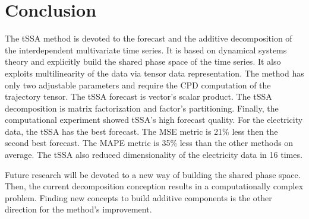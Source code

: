 \documentclass[referee, pdflatex, sn-mathphys-num]{sn-jnl}
\theoremstyle{definition}
\theoremstyle{plain}
\begin{document}
	\section{Conclusion}
	
		The tSSA method is devoted to the forecast and the additive decomposition of the interdependent multivariate time series. It is based on dynamical systems theory and explicitly build the shared phase space of the time series. It also exploits multilinearity of the data via tensor data representation. The method has only two adjustable parameters and require the CPD computation of the trajectory tensor. The tSSA forecast is vector's scalar product. The tSSA decomposition is matrix factorization and factor's partitioning. Finally, the computational experiment showed tSSA's high forecast quality. For the electricity data, the tSSA has the best forecast. The MSE metric is 21\% less then the second best forecast. The MAPE metric is 35\% less than the other methods on average. The tSSA also reduced dimensionality of the electricity data in 16 times.
		
		Future research will be devoted to a new way of building the shared phase space. Then, the current decomposition conception results in a computationally complex problem. Finding new concepts to build additive components is the other direction for the method's improvement.
		
		
	
 
\end{document}
